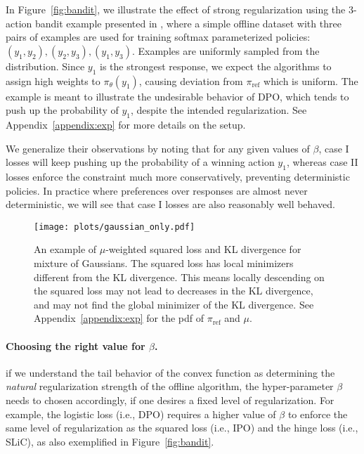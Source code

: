 In Figure~\ref{fig:bandit}, we illustrate the effect of strong regularization using the $3$-action bandit example presented in \citep{azar2023general}, where a simple offline dataset with three pairs of examples are used for training softmax parameterized policies: $(y_1,y_2), (y_2,y_3), (y_1,y_3)$. Examples are uniformly sampled from the distribution. Since $y_1$ is the strongest response, we expect the algorithms to assign high weights to $\pi_\theta(y_1)$, causing deviation from $\pi_\text{ref}$ which is uniform.
The example is meant to illustrate the undesirable behavior of DPO, which tends to push up the probability of $y_1$, despite the intended regularization. See Appendix~\ref{appendix:exp} for more details on the setup. 

We generalize their observations by noting that for any given values of $\beta$, case I losses will keep pushing up the probability of a winning action $y_1$, whereas case II losses enforce the constraint much more conservatively, preventing deterministic policies. In practice where preferences over responses are almost never deterministic, we will see that case I losses are also reasonably well behaved.

\begin{figure}[t]
    \centering
    \texttt{[image: plots/gaussian\_only.pdf]}
    \caption{\small{An example of $\mu$-weighted squared loss and KL divergence for mixture of Gaussians. The squared loss has local minimizers different from the KL divergence. This means locally descending on the squared loss may not lead to decreases in the KL divergence, and may not find the global minimizer of the KL divergence. See Appendix~\ref{appendix:exp} for the pdf of $\pi_\text{ref}$ and $\mu$.}}
    \label{fig:gaussians}
\end{figure}

\paragraph{Choosing the right value for $\beta$.} if we understand the tail behavior of the convex function as determining the \emph{natural} regularization strength of the offline algorithm, the hyper-parameter $\beta$ needs to chosen accordingly, if one desires a fixed level of regularization. For example, the logistic loss (i.e., DPO) requires a higher value of $\beta$ to enforce the same level of regularization as the squared loss (i.e., IPO) and the hinge loss (i.e., SLiC), as also exemplified in Figure~\ref{fig:bandit}.

